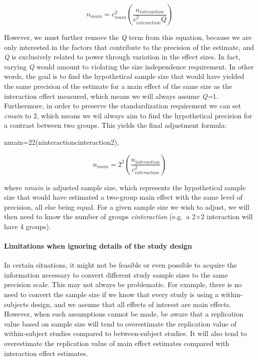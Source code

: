 \documentclass[]{article}
\let\oldparagraph\paragraph
\renewcommand{\paragraph}[1]{\oldparagraph{#1}\mbox{}}
\begin{document}
\[
\begin{equation}
n_{main}=c_{main}^2(\frac{n_{interaction}}{c_{interaction}^2Q})
\label{eq:inttomain}
\tag{14}
\end{equation}
\]

However, we must further remove the \emph{Q} term from this equation,
because we are only interested in the factors that contribute to the
precision of the estimate, and \emph{Q} is exclusively related to power
through variation in the effect sizes. In fact, varying \emph{Q} would
amount to violating the size independence requirement. In other words,
the goal is to find the hypothetical sample size that would have yielded
the same precision of the estimate for a main effect of the same size as
the interaction effect measured, which means we will always assume
\emph{Q=}1. Furthermore, in order to preserve the standardization
requirement we can set \emph{cmain} to 2, which means we wil always aim
to find the hypothetical precision for a contrast between two groups.
This yields the final adjustment formula:

nmain=22(ninteractioncinteraction2),

\[
\begin{equation}
n_{main}=2^2(\frac{n_{interaction}}{c_{interaction}^2})
\label{eq:inttomainsimple}
\tag{15}
\end{equation}
\]

where \emph{nmain} is adjusted sample size, which represents the
hypothetical sample size that would have estimated a two-group main
effect with the same level of precision, all else being equal. For a
given sample size we wish to adjust, we will then need to know the
number of groups \emph{cinteraction} (e.g.~a 2×2 interaction will have 4
groups).

\hypertarget{limitations-when-ignoring-details-of-the-study-design}{%
\paragraph{Limitations when ignoring details of the study
design}\label{limitations-when-ignoring-details-of-the-study-design}}

In certain situations, it might not be feasible or even possible to
acquire the information necessary to convert different study sample
sizes to the same precision scale. This may not always be problematic.
For example, there is no need to convert the sample size if we know that
every study is using a within-subjects design, and we assume that all
effects of interest are main effects. However, when such assumptions
cannot be made, be aware that a replication value based on sample size
will tend to overestimate the replication value of within-subject
studies compared to between-subject studies. It will also tend to
overestimate the replication value of main effect estimates compared
with interaction effect estimates.
\end{document}
